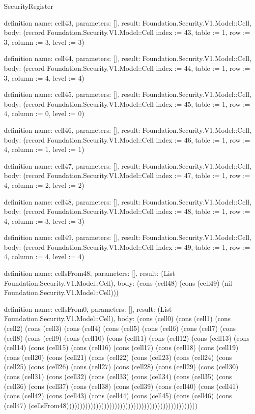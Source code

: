 \begin{lexlean}{SecurityRegister}
\begin{semanticmodule}
definition{
  name: cell43,
  parameters: [],
  result: Foundation.Security.V1.Model::Cell,
  body: (record Foundation.Security.V1.Model::Cell {index := 43, table := 1, row := 3, column := 3, level := 3})
}

definition{
  name: cell44,
  parameters: [],
  result: Foundation.Security.V1.Model::Cell,
  body: (record Foundation.Security.V1.Model::Cell {index := 44, table := 1, row := 3, column := 4, level := 4})
}

definition{
  name: cell45,
  parameters: [],
  result: Foundation.Security.V1.Model::Cell,
  body: (record Foundation.Security.V1.Model::Cell {index := 45, table := 1, row := 4, column := 0, level := 0})
}

definition{
  name: cell46,
  parameters: [],
  result: Foundation.Security.V1.Model::Cell,
  body: (record Foundation.Security.V1.Model::Cell {index := 46, table := 1, row := 4, column := 1, level := 1})
}

definition{
  name: cell47,
  parameters: [],
  result: Foundation.Security.V1.Model::Cell,
  body: (record Foundation.Security.V1.Model::Cell {index := 47, table := 1, row := 4, column := 2, level := 2})
}

definition{
  name: cell48,
  parameters: [],
  result: Foundation.Security.V1.Model::Cell,
  body: (record Foundation.Security.V1.Model::Cell {index := 48, table := 1, row := 4, column := 3, level := 3})
}

definition{
  name: cell49,
  parameters: [],
  result: Foundation.Security.V1.Model::Cell,
  body: (record Foundation.Security.V1.Model::Cell {index := 49, table := 1, row := 4, column := 4, level := 4})
}

definition{
  name: cellsFrom48,
  parameters: [],
  result: (List Foundation.Security.V1.Model::Cell),
  body: (cons (cell48) (cons (cell49) (nil Foundation.Security.V1.Model::Cell)))
}

definition{
  name: cellsFrom0,
  parameters: [],
  result: (List Foundation.Security.V1.Model::Cell),
  body: (cons (cell0) (cons (cell1) (cons (cell2) (cons (cell3) (cons (cell4) (cons (cell5) (cons (cell6) (cons (cell7) (cons (cell8) (cons (cell9) (cons (cell10) (cons (cell11) (cons (cell12) (cons (cell13) (cons (cell14) (cons (cell15) (cons (cell16) (cons (cell17) (cons (cell18) (cons (cell19) (cons (cell20) (cons (cell21) (cons (cell22) (cons (cell23) (cons (cell24) (cons (cell25) (cons (cell26) (cons (cell27) (cons (cell28) (cons (cell29) (cons (cell30) (cons (cell31) (cons (cell32) (cons (cell33) (cons (cell34) (cons (cell35) (cons (cell36) (cons (cell37) (cons (cell38) (cons (cell39) (cons (cell40) (cons (cell41) (cons (cell42) (cons (cell43) (cons (cell44) (cons (cell45) (cons (cell46) (cons (cell47) (cellsFrom48)))))))))))))))))))))))))))))))))))))))))))))))))
}


\end{semanticmodule}
\end{lexlean}
